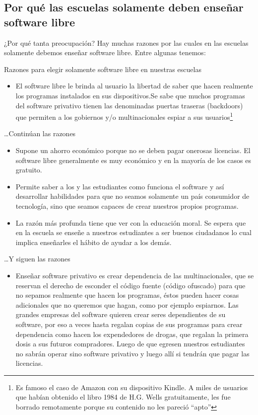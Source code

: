 \documentclass{beamer}
\begin{document}
\subsection{Por qué las escuelas solamente deben enseñar software libre}
\begin{frame}{¿Por qué tanta preocupación?}
Hay muchas razones por las cuales en las escuelas solamente debemos enseñar software libre. Entre algunas tenemos:\cite{esc}
\end{frame}
\begin{frame}{Razones para elegir solamente software libre en nuestras escuelas}
\begin{itemize}  
\item El software libre le brinda al usuario la libertad de saber que hacen realmente los programas instalados en sus dispositivos.Se sabe que muchos programas del software privativo tienen las denominadas puertas traseras (backdoors) que permiten a los gobiernos y/o multinacionales espiar a sus usuarios\footnote{Es famoso el caso de Amazon con su dispositivo Kindle. A miles de usuarios que habían obtenido el libro 1984 de H.G. Wells gratuitamente, les fue borrado remotamente porque su contenido no les pareció ``apto''}
\end{itemize}
\end{frame}
\begin{frame}{\ldots Continúan las razones}
\begin{itemize}
\item Supone un ahorro económico porque no se deben pagar onerosas licencias. El software libre generalmente es muy económico y en la mayoría de los casos es gratuito.\pause
\item Permite saber a los y las estudiantes como funciona el software y así desarrollar habilidades para que no seamos solamente un país consumidor de tecnología, sino que seamos capaces de crear nuestros propios programas.\pause
\item La razón más profunda tiene que ver con la \alert{educación moral}. Se espera que en la escuela se enseñe a nuestros estudiantes a ser buenos ciudadanos lo cual implica enseñarles el hábito de ayudar a los demás.
\end{itemize}
\end{frame}
\begin{frame}{\ldots Y siguen las razones}
\begin{itemize}
\item Enseñar software privativo es crear dependencia de las multinacionales, que se reservan el derecho de esconder el código fuente (\alert{código ofuscado}) para que no sepamos realmente que hacen los programas, éstos pueden hacer cosas adicionales que no queremos que hagan, como por ejemplo espiarnos. Las grandes empresas del software quieren crear seres dependientes de su software, por eso a veces hasta regalan copias de sus programas para crear dependencia como hacen los expendedores de drogas, que regalan la primera dosis a sus futuros compradores. Luego de que egresen nuestros estudiantes no sabrán operar sino software privativo y luego allí si tendrán que pagar las licencias. 
\end{itemize}
\end{frame}
\end{document}
